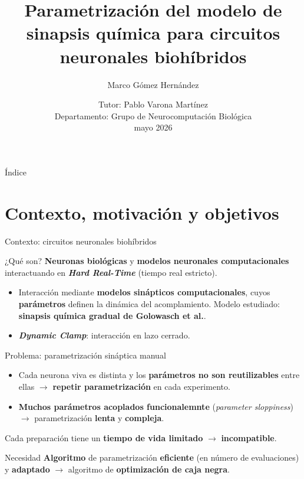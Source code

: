 \documentclass[10pt, aspectratio=169]{beamer}
\title[Parametrización de sinapsis químicas]{Parametrización del modelo de sinapsis química para circuitos neuronales biohíbridos}
\author{Marco Gómez Hernández}
\institute{Escuela Politécnica Superior — Universidad Autónoma de Madrid}
\date{\small Tutor: Pablo Varona Martínez\\ \vspace{0.3em} Departamento: Grupo de Neurocomputación Biológica\\ \vspace{0.3em} \scriptsize mayo 2026}
\begin{document}
\begin{frame}[plain]
    \titlepage
\end{frame}




\begin{frame}{Índice}
    \tableofcontents
\end{frame}


\section{Contexto, motivación y objetivos}



\begin{frame}{Contexto: circuitos neuronales biohíbridos}
    \begin{block}{¿Qué son?}
        \textbf{Neuronas biológicas} y \textbf{modelos neuronales computacionales} interactuando en \textbf{\textit{Hard Real-Time}} (tiempo real estricto).
    \end{block}
    \vspace{0.8em}
    \begin{itemize}
        \item Interacción mediante \textbf{modelos sinápticos computacionales}, cuyos \textbf{parámetros} definen la dinámica del acomplamiento. Modelo estudiado: \textbf{sinapsis química gradual de Golowasch et al.}.
        \item \textbf{\textit{Dynamic Clamp}}: interacción en lazo cerrado.
    \end{itemize}
\end{frame}


\begin{frame}{Problema: parametrización sináptica manual}
    \begin{itemize}
        \item Cada neurona viva es distinta y los \textbf{parámetros no son reutilizables} entre ellas $\to$ \textbf{repetir parametrización} en cada experimento.
        \item \textbf{Muchos parámetros acoplados funcionalemnte} (\textit{parameter sloppiness}) $\to$ parametrización \textbf{lenta} y \textbf{compleja}.
    \end{itemize}
    \vspace{0.8em}
    Cada preparación tiene un \textbf{tiempo de vida limitado} $\to$ \textbf{incompatible}.
    \vspace{0.8em}
    \begin{block}{Necesidad}
        \textbf{Algoritmo} de parametrización \textbf{eficiente} (en número de evaluaciones) y \textbf{adaptado} $\to$ algoritmo de \textbf{optimización de caja negra}.
    \end{block}
\end{frame}
\end{document}
